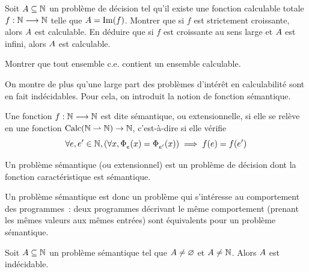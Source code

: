 \begin{exercise}\label{exo.enum.cr}
  Soit $A\subseteq \mathbb N$ un problème de décision tel qu'il existe une
  fonction calculable totale $f : \displaystyle \mathbb N \longrightarrow \mathbb N$ telle que
  $A = \operatorname{Im}(f)$.
  Montrer que si $f$ est strictement croissante, alors $A$ est calculable.
  En déduire que si $f$ est croissante au sens large et $A$ est infini,
  alors $A$ est calculable.
\end{exercise}

\begin{exercise}
  Montrer que tout ensemble c.e. contient un ensemble calculable.
\end{exercise}

On montre de plus qu'une large part des problèmes d'intérêt en calculabilité
sont en fait indécidables. Pour cela, on introduit la notion de fonction
sémantique.

\begin{definition}
  Une fonction $f : \displaystyle \mathbb N \longrightarrow \mathbb N$ est dite sémantique, ou
  extensionnelle, si elle se relève en une fonction
  $\operatorname{Calc}(\mathbb N \rightharpoonup \mathbb N) \to \mathbb N$, c'est-à-dire si elle vérifie
  \[\forall e,e' \in \mathbb N, (\forall x, \operatorname{\Phi}_{e}^{}(x) = \operatorname{\Phi}_{e'}^{}(x))
  \implies f(e) = f(e')\]

  Un problème sémantique (ou extensionnel) est un problème de décision dont la
  fonction caractéristique est sémantique.
\end{definition}

Un problème sémantique est donc un problème qui s'intéresse au comportement des
programmes~: deux programmes décrivant le même comportement (prenant les mêmes
valeurs aux mêmes entrées) sont équivalents pour un problème sémantique.

\begin{theorem}
  Soit $A \subseteq \mathbb N$ un problème sémantique tel que $A \neq \varnothing$
  et $A \neq \mathbb N$. Alors $A$ est indécidable.
\end{theorem}

